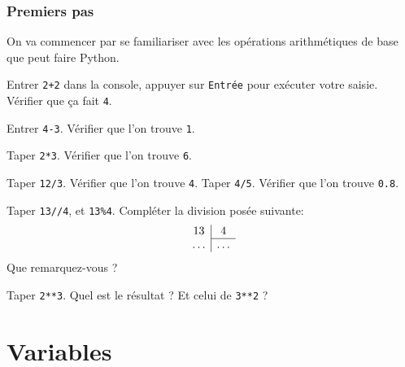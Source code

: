 \begin{frame}[fragile]
	\frametitle{Premiers pas}
	\begin{exo}
		On va commencer par se familiariser avec les opérations arithmétiques de base que peut faire Python.
		
		\begin{description}[<+->]
		\item[Addition] Entrer \lstinline|2+2| dans la console, appuyer sur \lstinline|Entrée| pour exécuter votre saisie. Vérifier que ça fait \lstinline|4|.
		\item[Soustraction] Entrer \lstinline|4-3|. Vérifier que l'on trouve \lstinline|1|.
		\item[Produit] Taper \lstinline|2*3|. Vérifier que l'on trouve \lstinline|6|.
		\item[Division] Taper \lstinline|12/3|. Vérifier que l'on trouve \lstinline|4|. Taper \lstinline|4/5|. Vérifier que l'on trouve \lstinline|0.8|.
		\item[...de CM1] Taper \lstinline|13//4|, et \lstinline|13%4|. Compléter la division posée suivante:
			\[
			\begin{array}{c|c}
			13      & 4\\ \cline{2-2}
			\ldots  & \ldots
			\end{array}
			 \]
			Que remarquez-vous ?
		\item[Puissances] Taper \lstinline|2**3|. Quel est le résultat ? Et celui de \lstinline|3**2| ?
		\end{description}
	\end{exo}
\end{frame}

\section{Variables}

